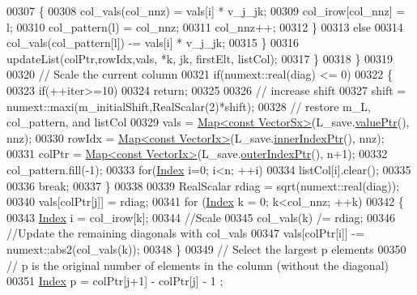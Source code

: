 \begin{DoxyCode}
00307             \{
00308               col\_vals(col\_nnz) = vals[i] * v\_j\_jk;
00309               col\_irow[col\_nnz] = l;
00310               col\_pattern(l) = col\_nnz;
00311               col\_nnz++;
00312             \}
00313             \textcolor{keywordflow}{else}
00314               col\_vals(col\_pattern[l]) -= vals[i] * v\_j\_jk;
00315           \}
00316           updateList(colPtr,rowIdx,vals, *k, jk, firstElt, listCol);
00317         \}
00318       \}
00319 
00320       \textcolor{comment}{// Scale the current column}
00321       \textcolor{keywordflow}{if}(numext::real(diag) <= 0)
00322       \{
00323         \textcolor{keywordflow}{if}(++iter>=10)
00324           \textcolor{keywordflow}{return};
00325 
00326         \textcolor{comment}{// increase shift}
00327         shift = numext::maxi(m\_initialShift,RealScalar(2)*shift);
00328         \textcolor{comment}{// restore m\_L, col\_pattern, and listCol}
00329         vals = \hyperlink{group___core___module_class_eigen_1_1_map}{Map<const VectorSx>}(L\_save.\hyperlink{group___sparse_core___module_a9d4354d3f4d121d764bbed33cac05329}{valuePtr}(), nnz);
00330         rowIdx = \hyperlink{group___core___module_class_eigen_1_1_map}{Map<const VectorIx>}(L\_save.\hyperlink{group___sparse_core___module_ae7b804bd39745156d20ca1611a296b67}{innerIndexPtr}(), nnz);
00331         colPtr = \hyperlink{group___core___module_class_eigen_1_1_map}{Map<const VectorIx>}(L\_save.\hyperlink{group___sparse_core___module_a75506964d86d6badb32d0b4917acf2e2}{outerIndexPtr}(), n+1);
00332         col\_pattern.fill(-1);
00333         \textcolor{keywordflow}{for}(\hyperlink{namespace_eigen_a62e77e0933482dafde8fe197d9a2cfde}{Index} i=0; i<n; ++i)
00334           listCol[i].clear();
00335 
00336         \textcolor{keywordflow}{break};
00337       \}
00338 
00339       RealScalar rdiag = sqrt(numext::real(diag));
00340       vals[colPtr[j]] = rdiag;
00341       \textcolor{keywordflow}{for} (\hyperlink{namespace_eigen_a62e77e0933482dafde8fe197d9a2cfde}{Index} k = 0; k<col\_nnz; ++k)
00342       \{
00343         \hyperlink{namespace_eigen_a62e77e0933482dafde8fe197d9a2cfde}{Index} i = col\_irow[k];
00344         \textcolor{comment}{//Scale}
00345         col\_vals(k) /= rdiag;
00346         \textcolor{comment}{//Update the remaining diagonals with col\_vals}
00347         vals[colPtr[i]] -= numext::abs2(col\_vals(k));
00348       \}
00349       \textcolor{comment}{// Select the largest p elements}
00350       \textcolor{comment}{// p is the original number of elements in the column (without the diagonal)}
00351       \hyperlink{namespace_eigen_a62e77e0933482dafde8fe197d9a2cfde}{Index} p = colPtr[j+1] - colPtr[j] - 1 ;

\end{DoxyCode}
